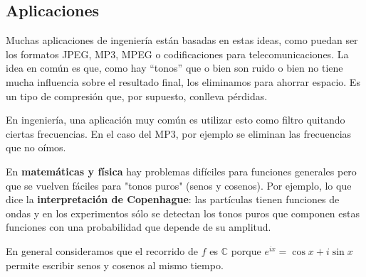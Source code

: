 \begin{example}
\end{example}

\subsection{Aplicaciones}
Muchas aplicaciones de ingeniería están basadas en estas ideas, como puedan ser los formatos JPEG, MP3, MPEG o codificaciones para telecomunicaciones. La idea en común es que, como hay ``tonos'' que o bien son ruido o bien no tiene mucha influencia sobre el resultado final, los eliminamos para ahorrar espacio. Es un tipo de compresión que, por supuesto, conlleva pérdidas.

En ingeniería, una aplicación muy común es utilizar esto como filtro quitando ciertas frecuencias. En el caso del MP3, por ejemplo se eliminan las frecuencias que no oímos.

En \textbf{matemáticas y física} hay problemas difíciles para funciones generales pero que se vuelven fáciles para "tonos puros" (senos y cosenos). Por ejemplo, lo que dice la \textbf{interpretación de Copenhague}: las partículas tienen funciones de ondas y en los experimentos sólo se detectan los tonos puros que componen estas funciones con una probabilidad que depende de su amplitud.




%
%





	\obs En general consideramos que el recorrido de $f$ es $\mathbb{C}$ porque $e^{ix} = \cos x + i\sin x$ permite escribir senos y cosenos al mismo tiempo.


